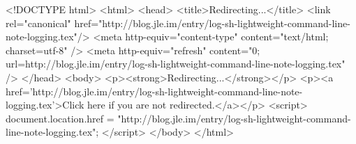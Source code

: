 <!DOCTYPE html>
<html>
<head>
<title>Redirecting...</title>
<link rel="canonical" href="http://blog.jle.im/entry/log-sh-lightweight-command-line-note-logging.tex"/>
<meta http-equiv="content-type" content="text/html; charset=utf-8" />
<meta http-equiv="refresh" content="0; url=http://blog.jle.im/entry/log-sh-lightweight-command-line-note-logging.tex" />
</head>
<body>
  <p><strong>Redirecting...</strong></p>
  <p><a href='http://blog.jle.im/entry/log-sh-lightweight-command-line-note-logging.tex'>Click here if you are not redirected.</a></p>
  <script>
    document.location.href = "http://blog.jle.im/entry/log-sh-lightweight-command-line-note-logging.tex";
  </script>
</body>
</html>

